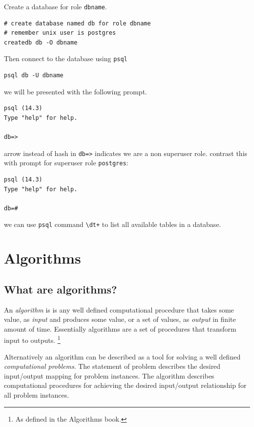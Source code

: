 \documentclass[a4paper]{article}
\begin{document}
\lstset{style=custom-bash}

Create a database for role \lstinline{dbname}.

\begin{lstlisting}
# create database named db for role dbname
# remember unix user is postgres
createdb db -O dbname
\end{lstlisting}

Then connect to the database using \lstinline{psql}

\begin{lstlisting}
psql db -U dbname
\end{lstlisting}

we will be presented with the following prompt.

\begin{lstlisting}
psql (14.3)
Type "help" for help.

db=> 
\end{lstlisting}

arrow instead of hash in \lstinline{db=>} indicates we are a non superuser role. contrast this with prompt for superuser role
\lstinline{postgres}:

\begin{lstlisting}
psql (14.3)
Type "help" for help.

db=#
\end{lstlisting}

we can use \lstinline{psql} command \lstinline{\dt+} to list all available tables in a database.

\section*{Algorithms}

\subsection*{What are algorithms?}

An \emph{algorithm} is is any well defined computational procedure that takes some value, as \emph{input} and produces some value, 
or a set of values, as \emph{output} in finite amount of time. Essentially algorithms are a set of procedures that transform input to outputs.
\footnote{As defined in the Algorithms book.}

Alternatively an algorithm can be described as a tool for solving a well defined \emph{computational problems}. The statement of problem describes
the desired input/output mapping for problem instances. The algorithm describes computational procedures for achieving the desired input/output relationship
for all problem instances.
\end{document}
